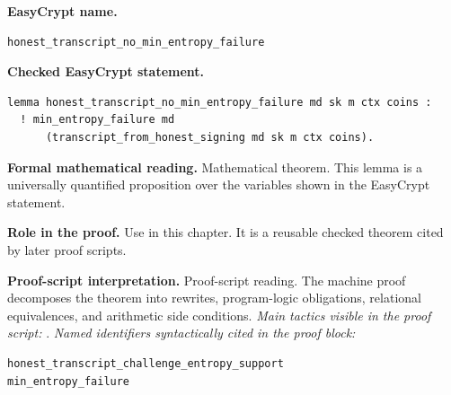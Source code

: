 \begin{formaltheorem}
\noindent\textbf{EasyCrypt name.}
\begin{lstlisting}[language=EasyCrypt,basicstyle=\ttfamily\scriptsize]
honest_transcript_no_min_entropy_failure
\end{lstlisting}
\noindent\textbf{Checked EasyCrypt statement.}
\begin{lstlisting}[language=EasyCrypt,basicstyle=\ttfamily\scriptsize]
lemma honest_transcript_no_min_entropy_failure md sk m ctx coins :
  ! min_entropy_failure md
      (transcript_from_honest_signing md sk m ctx coins).
\end{lstlisting}
\noindent\textbf{Formal mathematical reading.}
Mathematical theorem. This lemma is a universally quantified proposition over the variables shown in the EasyCrypt statement.

\noindent\textbf{Role in the proof.}
Use in this chapter. It is a reusable checked theorem cited by later proof scripts.

\noindent\textbf{Proof-script interpretation.}
Proof-script reading. The machine proof decomposes the theorem into rewrites, program-logic obligations, relational equivalences, and arithmetic side conditions.
\emph{Main tactics visible in the proof script:} .
\emph{Named identifiers syntactically cited in the proof block:}
\begin{lstlisting}[language=EasyCrypt,basicstyle=\ttfamily\scriptsize]
honest_transcript_challenge_entropy_support
min_entropy_failure
\end{lstlisting}

\end{formaltheorem}

